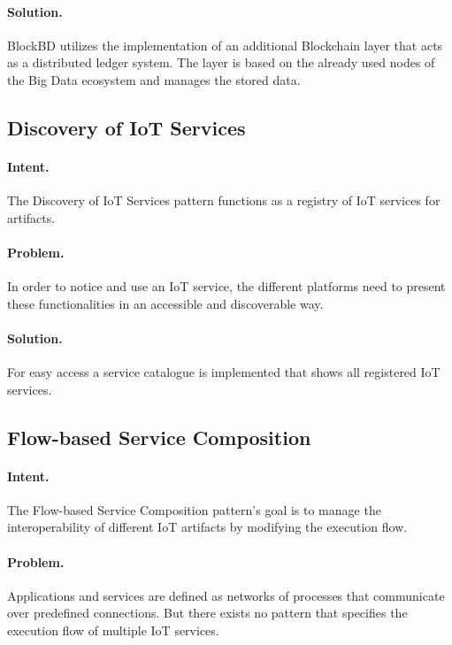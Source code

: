 \paragraph{\textbf{Solution.}} BlockBD utilizes the implementation of an additional Blockchain layer that acts as a distributed ledger system. The layer is based on the already used nodes of the Big Data ecosystem and manages the stored data.


\subsection{Discovery of IoT Services~\cite{Tkaczyk2018}} 
\label{p:discover}

\paragraph{\textbf{Intent.}} The Discovery of IoT Services pattern functions as a registry of IoT services for artifacts.

\paragraph{\textbf{Problem.}} In order to notice and use an IoT service, the different platforms need to present these functionalities in an accessible and discoverable way.

\paragraph{\textbf{Solution.}} For easy access a service catalogue is implemented that shows all registered IoT services.


\subsection{Flow-based Service Composition~\cite{Tkaczyk2018}}
\label{p:flow} 

\paragraph{\textbf{Intent.}} The Flow-based Service Composition pattern's goal is to manage the interoperability of different IoT artifacts by modifying the execution flow.

\paragraph{\textbf{Problem.}} Applications and services are defined as networks of  processes that communicate over predefined connections. But there exists no pattern that specifies the execution flow of multiple IoT services. 


